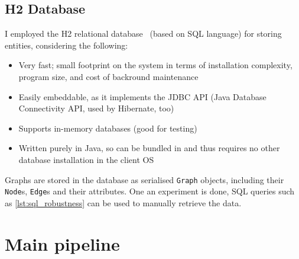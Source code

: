 \subsection{H2 Database}

I employed the H2 relational database~\cite{MuellerH2DatabaseEngine2006} (based on SQL language) for storing entities, considering the following:
\begin{itemize}[topsep=5pt,itemsep=-2pt]
    \item Very fast; small footprint on the system in terms of installation complexity, program size, and cost of backround maintenance
    \item Easily embeddable, as it implements the JDBC API (Java Database Connectivity API, used by Hibernate, too)
    \item Supports in-memory databases (good for testing)
    \item Written purely in Java, so can be bundled in \graffs and thus requires no other database installation in the client OS
\end{itemize}
Graphs are stored in the database as serialised \texttt{Graph} objects, including their \texttt{Node}s, \texttt{Edge}s and their attributes.
One an experiment is done, SQL queries such as \autoref{lst:sql_robustness} can be used to manually retrieve the data.




\section{Main pipeline}\label{sec:main_pipeline}

